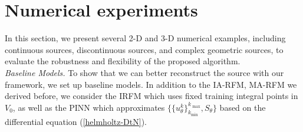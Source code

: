 \documentclass{article}
\theoremstyle{plain}
\theoremstyle{definition}
\newcounter{example}[section]         %
\begin{document}
{\section{Numerical experiments}
In this section, we present several 2-D and 3-D numerical examples, including continuous sources, discontinuous sources, and complex geometric sources, to evaluate the robustness and flexibility of the proposed algorithm.\\

\noindent\emph{Baseline Models.} To show that we can better reconstruct the source with our framework, we set up baseline models. In addition to the IA-RFM, MA-RFM we derived before, we consider the IRFM which uses fixed training integral points in $V_0$, as well as the PINN which approximates $\{\{u^{k}_{\theta}\}_{k_\text{min}}^{k_\text{ max}}, S_{\theta}\}$ based on the differential equation (\ref{helmholtz-DtN}).\\

}
\end{document}
